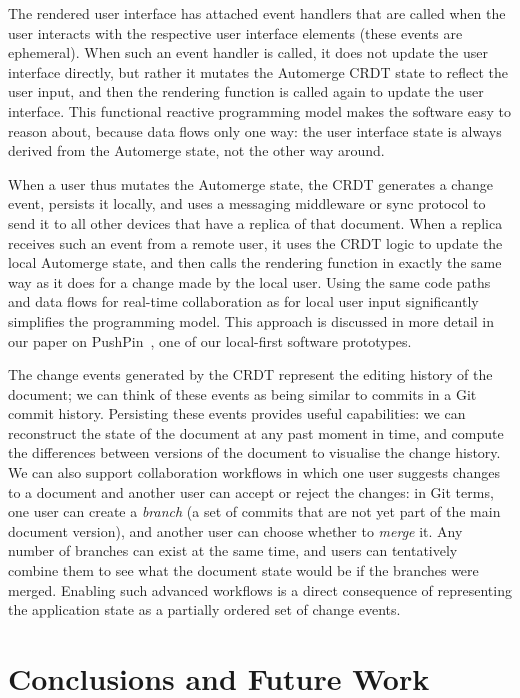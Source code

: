 \documentclass[sigconf]{acmart}
\begin{document}
The rendered user interface has attached event handlers that are called when the user interacts with the respective user interface elements (these events are ephemeral).
When such an event handler is called, it does not update the user interface directly, but rather it mutates the Automerge CRDT state to reflect the user input, and then the rendering function is called again to update the user interface.
This functional reactive programming model makes the software easy to reason about, because data flows only one way: the user interface state is always derived from the Automerge state, not the other way around.

When a user thus mutates the Automerge state, the CRDT generates a change event, persists it locally, and uses a messaging middleware or sync protocol to send it to all other devices that have a replica of that document.
When a replica receives such an event from a remote user, it uses the CRDT logic to update the local Automerge state, and then calls the rendering function in exactly the same way as it does for a change made by the local user.
Using the same code paths and data flows for real-time collaboration as for local user input significantly simplifies the programming model.
This approach is discussed in more detail in our paper on PushPin~\cite{vanHardenberg:2020}, one of our local-first software prototypes.

The change events generated by the CRDT represent the editing history of the document; we can think of these events as being similar to commits in a Git commit history.
Persisting these events provides useful capabilities: we can reconstruct the state of the document at any past moment in time, and compute the differences between versions of the document to visualise the change history.
We can also support collaboration workflows in which one user suggests changes to a document and another user can accept or reject the changes: in Git terms, one user can create a \emph{branch} (a set of commits that are not yet part of the main document version), and another user can choose whether to \emph{merge} it.
Any number of branches can exist at the same time, and users can tentatively combine them to see what the document state would be if the branches were merged.
Enabling such advanced workflows is a direct consequence of representing the application state as a partially ordered set of change events.

\section{Conclusions and Future Work}\label{sec:future-work}
\end{document}
